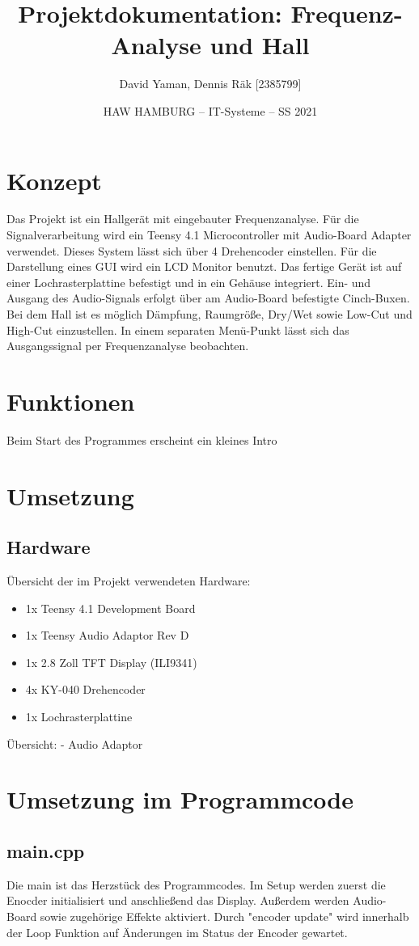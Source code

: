 \documentclass[12pt]{article}
\title{Projektdokumentation: Frequenz-Analyse und Hall}        %
\author{David Yaman, Dennis Räk [2385799]}            %
\date{HAW HAMBURG -- IT-Systeme -- SS 2021}                    %
\begin{document}
\maketitle
\newpage
\tableofcontents
\newpage
\section{Konzept}
Das Projekt ist ein Hallgerät mit eingebauter Frequenzanalyse. Für die Signalverarbeitung wird ein 
Teensy 4.1 Microcontroller mit Audio-Board Adapter verwendet. Dieses System lässt sich über 4 Drehencoder einstellen.
Für die Darstellung eines GUI wird ein LCD Monitor benutzt. Das fertige Gerät ist auf einer Lochrasterplattine befestigt und in 
ein Gehäuse integriert. Ein- und Ausgang des Audio-Signals erfolgt über am Audio-Board befestigte Cinch-Buxen. Bei dem Hall ist es möglich
Dämpfung, Raumgröße, Dry/Wet sowie Low-Cut und High-Cut einzustellen. In einem separaten Menü-Punkt lässt sich das Ausgangssignal per Frequenzanalyse beobachten.
\section{Funktionen}
Beim Start des Programmes erscheint ein kleines Intro
\section{Umsetzung}
\subsection{Hardware}
Übersicht der im Projekt verwendeten Hardware:
\begin{itemize}
    \item 1x Teensy 4.1 Development Board
    \item 1x Teensy Audio Adaptor Rev D
    \item 1x 2.8 Zoll TFT Display (ILI9341)
    \item 4x KY-040 Drehencoder
    \item 1x Lochrasterplattine
\end{itemize}
Übersicht:
- Audio Adaptor 
\newpage
\section{Umsetzung im Programmcode}
\subsection{main.cpp}
Die main ist das Herzstück des Programmcodes. Im Setup werden zuerst die Enocder initialisiert und anschließend das Display. 
Außerdem werden Audio-Board sowie zugehörige Effekte aktiviert. 
Durch "encoder update" wird innerhalb der Loop Funktion auf Änderungen im Status der Encoder gewartet.
\end{document}
